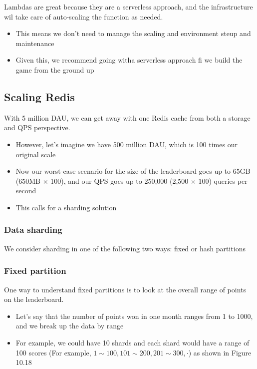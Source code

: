 \documentclass{report}
\theoremstyle{definition}
\let\oldsubsection\subsection
\let\oldsubsubsection\subsubsection
\renewcommand{\subsection}{\oldsubsection*}
\renewcommand{\subsubsection}{\oldsubsubsection*}
\begin{document}
Lambdas are great because they are a serverless approach, and the infrastructure wil take care of auto-scaling the function as needed.

\begin{itemize}
\item
This means we don't need to manage the scaling and environment steup and maintenance
\item
Given this, we recommend going witha serverless approach fi we build the game from the ground up
\end{itemize}

\subsection{Scaling Redis}

With 5 million DAU, we can get away with one Redis cache from both a storage and QPS perspective.

\begin{itemize}
\item
However, let's imagine we have 500 million DAU, which is 100 times our original scale
\item
Now our worst-case scenario for the size of the leaderboard goes up to 65GB (650MB $\times$ 100), and our QPS goes up to 250,000 (2,500 $\times$ 100) queries per second
\item
This calls for a sharding solution
\end{itemize}

\subsubsection{Data sharding}

We consider sharding in one of the following two ways: fixed or hash partitions

\subsubsection{Fixed partition}

One way to understand fixed partitions is to look at the overall range of points on the leaderboard.

\begin{itemize}
\item
Let's say that the number of points won in one month ranges from 1 to 1000, and we break up the data by range
\item
For example, we could have 10 shards and each shard would have a range of 100 scores (For example, $1 \sim 100, 101 \sim 200, 201 \sim 300, \cdot$) as shown in Figure 10.18
\end{itemize}
\end{document}
